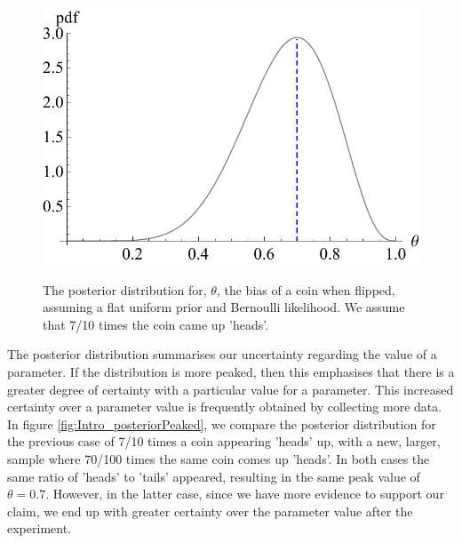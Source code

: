 \documentclass[11pt,fullpage]{book}
\begin{document}
\begin{figure}
\centering
\scalebox{0.6} 
{\includegraphics{Intro_posterior.pdf}}
\caption{The posterior distribution for, $\theta$, the bias of a coin when flipped, assuming a flat uniform prior and Bernoulli likelihood. We assume that 7/10 times the coin came up 'heads'.}\label{fig:Intro_posterior}
\end{figure}

The posterior distribution summarises our uncertainty regarding the value of a parameter. If the distribution is more peaked, then this emphasises that there is a greater degree of certainty with a particular value for a parameter. This increased certainty over a parameter value is frequently obtained by collecting more data. In figure \ref{fig:Intro_posteriorPeaked}, we compare the posterior distribution for the previous case of 7/10 times a coin appearing 'heads' up, with a new, larger, sample where 70/100 times the same coin comes up 'heads'. In both cases the same ratio of 'heads' to 'tails' appeared, resulting in the same peak value of $\theta=0.7$. However, in the latter case, since we have more evidence to support our claim, we end up with greater certainty over the parameter value after the experiment.
\end{document}
